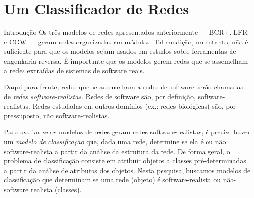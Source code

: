 \chapter{Um Classificador de Redes}


\begin{section}{Introdução}
	Os três modelos de redes apresentados anteriormente --- BCR+, LFR e CGW --- geram redes organizadas em módulos. Tal condição, no entanto, não é suficiente para que os modelos sejam usados em estudos sobre ferramentas de engenharia reversa. É importante que os modelos gerem redes que se assemelham a redes extraídas de sistemas de software reais.
	
	Daqui para frente, redes que se assemelham a redes de software serão chamadas de \emph{redes software-realistas}. Redes de software são, por definição, software-realistas. Redes estudadas em outros domínios (ex.: redes biológicas) são, por pressuposto, não software-realistas.
	
	Para avaliar se os modelos de redes geram redes software-realistas, é preciso haver um \emph{modelo de classificação} que, dada uma rede, determine se ela é ou não software-realista a partir da análise da estrutura da rede. De forma geral, o problema de classificação consiste em atribuir objetos a classes pré-determinadas a partir da análise de atributos dos objetos. Nesta pesquisa, buscamos modelos de classificação que determinam se uma rede (objeto) é software-realista ou não-software realista (classes).
\end{section}

